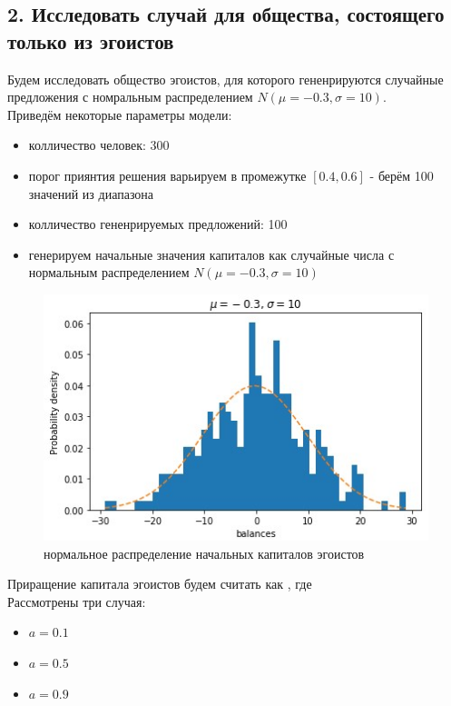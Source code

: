 \documentclass{article}
\begin{document}
	\subsection*{2. Исследовать случай для общества, состоящего только из эгоистов}
	Будем исследовать общество эгоистов, для которого гененрируются случайные предложения с номральным распределением $N\left( \mu = -0.3, \sigma = 10\right)$.\\
	Приведём некоторые параметры модели:
		\begin{itemize}
			\item колличество человек: 300
			\item порог приянтия решения варьируем в промежутке $\left[ 0.4, 0.6\right] $ - берём 100 значений из диапазона
			\item колличество гененрируемых предложений: 100 
			\item генерируем начальные значения капиталов как случайные числа с нормальным распределением $N\left( \mu = -0.3, \sigma = 10\right)$
		\end{itemize}
	 \begin{figure}[h]
	 	\centering
	 	\includegraphics[width=0.8\linewidth]{assets/balances_distribution.jpg}
	 	\caption{нормальное распределение начальных капиталов эгоистов}
	 	\label{fig:mpr}
	 \end{figure}
 Приращение капитала эгоистов будем считать как , где \\
	Рассмотрены три случая:
		\begin{itemize}
			\item $a = 0.1$
			\item $a = 0.5$
			\item $a = 0.9$ 
		\end{itemize}
\end{document}
